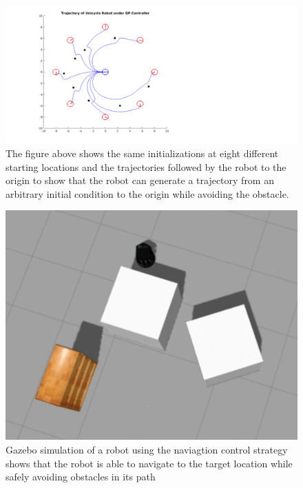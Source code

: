 \documentclass[conference]{IEEEtran}
\begin{document}
\begin{figure}[t]
\begin{center}
\includegraphics[scale=0.3]{octoPlotProofEditSqur.png} 
\caption{The figure above shows the same initializations at eight different starting locations and the trajectories followed by the robot to the origin to show that the robot can generate a trajectory from an arbitrary initial condition to the origin while avoiding the obstacle.\label{fig:octoplot}}
\end{center}
\end{figure}

\begin{figure}[b]
\centering
\includegraphics[scale=0.3]{Gazebo_exp.png} 
\caption{Gazebo simulation of a robot using the naviagtion control strategy shows that the robot is able to navigate to the target location while safely avoiding obstacles in its path\label{fig:gazebo}}
\end{figure}
\end{document}
